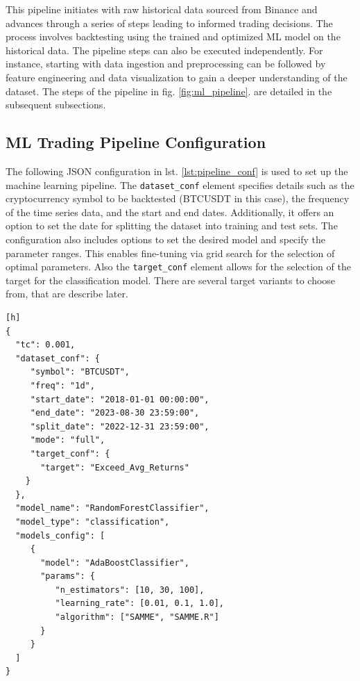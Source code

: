 This pipeline initiates with raw historical data sourced from Binance and advances through a series of steps
leading to informed trading decisions. The process involves backtesting using the trained and optimized ML model on the historical data.
The pipeline steps can also be executed independently.
For instance, starting with data ingestion and preprocessing can be followed by feature engineering and data visualization to gain a deeper understanding of the dataset. The steps of the pipeline in  fig. \ref{fig:ml_pipeline}. are detailed in the subsequent subsections.

\subsection{ML Trading Pipeline Configuration}
The following JSON configuration in lst. \ref{lst:pipeline_conf} is used to set up the machine learning pipeline.
The \texttt{dataset\_conf} element specifies details such as the cryptocurrency symbol to be backtested (BTCUSDT in this case), the frequency of the time series data, and the start and end dates. Additionally, it offers an option to set the date for splitting the dataset into training and test sets.
The configuration also includes options to set the desired model and specify the parameter ranges. This enables fine-tuning via grid search for the selection of optimal parameters.
Also the \texttt{target\_conf} element allows for the selection of the target for the classification model. There are several target variants to choose from, that are describe later.



\noindent\begin{minipage}{\linewidth}
\begin{lstlisting}[style=jsonstyle, caption={Machine Learning Pipeline Configuration},  captionpos=b, label=lst:pipeline_conf][h]
{
  "tc": 0.001,
  "dataset_conf": {
     "symbol": "BTCUSDT",
     "freq": "1d",
     "start_date": "2018-01-01 00:00:00",
     "end_date": "2023-08-30 23:59:00",
     "split_date": "2022-12-31 23:59:00",
     "mode": "full",
     "target_conf": {
       "target": "Exceed_Avg_Returns"
    }
  },
  "model_name": "RandomForestClassifier",
  "model_type": "classification",
  "models_config": [
     {
       "model": "AdaBoostClassifier",
       "params": {
          "n_estimators": [10, 30, 100],
          "learning_rate": [0.01, 0.1, 1.0],
          "algorithm": ["SAMME", "SAMME.R"]
       }
     }
  ]
}
\end{lstlisting}
\end{minipage}



